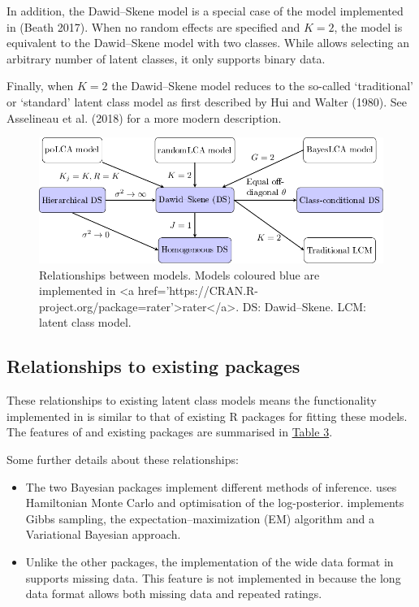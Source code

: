 In addition, the Dawid--Skene model is a special case of the model
implemented in  (Beath 2017). When no random effects are
specified and \(K = 2\), the model is equivalent to the Dawid--Skene model with
two classes. While  allows
selecting an arbitrary number of latent classes, it only supports binary
data.

Finally, when \(K = 2\) the Dawid--Skene model reduces to the so-called
`traditional' or `standard' latent class model as first described by
Hui and Walter (1980). See Asselineau et al. (2018) for a more modern description.

\begin{figure}
\includegraphics[width=1\linewidth]{tikz/figrelationships} \caption{Relationships between models. Models coloured blue are implemented in <a href='https://CRAN.R-project.org/package=rater'>rater</a>. DS: Dawid–Skene. LCM: latent class model.}\label{fig:relationships}
\end{figure}

\hypertarget{sec:relationships-existing-packages}{%
\subsection{Relationships to existing packages}\label{sec:relationships-existing-packages}}

These relationships to existing latent class models means the
functionality implemented in  is similar to that
of existing R packages for fitting these models. The features of
 and existing packages are summarised in \protect\hyperlink{tab:package-features}{Table 3}.

Some further details about these relationships:

\begin{itemize}
\item
  The two Bayesian packages implement different methods of inference.
   uses Hamiltonian
  Monte Carlo and optimisation of the log-posterior. 
  implements Gibbs sampling, the expectation--maximization (EM) algorithm and a
  Variational Bayesian approach.
\item
  Unlike the other packages, the implementation of the wide data
  format in  supports missing data. This feature is not
  implemented in  because the long
  data format allows both missing data and repeated ratings.
\end{itemize}

